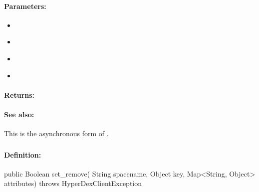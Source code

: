 \paragraph{Parameters:}
\begin{itemize}[noitemsep]
\item {}\\

\item {}\\

\item {}\\

\item {}\\

\end{itemize}

\paragraph{Returns:}


\paragraph{See also:}  This is the asynchronous form of .

\pagebreak
\subsubsection{}
\label{api:java:set_remove}


\paragraph{Definition:}
\begin{javacode}
public Boolean set_remove(
        String spacename,
        Object key,
        Map<String, Object> attributes) throws HyperDexClientException
\end{javacode}

